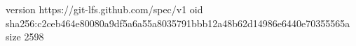version https://git-lfs.github.com/spec/v1
oid sha256:c2ceb464e80080a9df5a6a55a8035791bbb12a48b62d14986e6440e70355565a
size 2598
